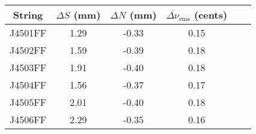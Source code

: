 \begin{tabular}{cccccc}
\toprule
String & $\Delta S$ (mm) & $\Delta N$ (mm) & $\overline{\Delta \nu}_\text{rms}$ (cents) \\
\midrule
J4501FF & 1.29 & -0.33 & 0.15 \\
J4502FF & 1.59 & -0.39 & 0.18 \\
J4503FF & 1.91 & -0.40 & 0.18 \\
J4504FF & 1.56 & -0.37 & 0.17 \\
J4505FF & 2.01 & -0.40 & 0.18 \\
J4506FF & 2.29 & -0.35 & 0.16 \\
\bottomrule
\end{tabular}

